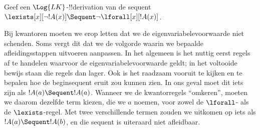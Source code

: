 \documentclass[../../../include/open-logic-section]{subfiles}
\begin{document}


\begin{ex}
Geef een $\Log{LK}$-!!{derivation} van de sequent
$\lexists[x][\lnot !A(x)] \Sequent \lnot \lforall[x][!A(x)]$.

Bij kwantoren moeten we erop letten dat we de
eigenvariabelevoorwaarde niet schenden. Soms vergt dit dat we de
volgorde waarin we bepaalde afleidingsstappen uitvoeren aanpassen. In
het algemeen is het nuttig eerst regels af te handelen waarvoor de
eigenvariabelevoorwaarde geldt; in het voltooide bewijs staan die
regels dan lager. Ook is het raadzaam vooruit te kijken en te bepalen
hoe de beginsequent eruit zou kunnen zien. In ons geval moet dit iets
zijn als $!A(a) \Sequent !A(a)$. Wanneer we de kwantorregels
``omkeren'', moeten we daarom dezelfde term kiezen, die we $a$ noemen,
voor zowel de $\lforall$- als de $\lexists$-regel. Met twee
verschillende termen zouden we uitkomen op iets als $!A(a) \Sequent
!A(b)$, en die sequent is uiteraard niet afleidbaar.


\end{ex}
\end{document}
